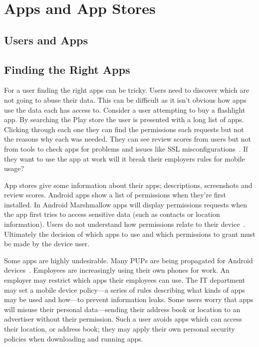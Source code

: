 \documentclass[thesis.tex]{subfiles}
\begin{document}
\chapter{Apps and App Stores}

\section{Users and Apps}

\section{Finding the Right Apps}

For a user finding the right apps can be tricky.
Users need to discover which are not going to abuse their data.
This can be difficult as it isn't obvious how apps use the data each has access to.
Consider a user attempting to buy a flashlight app.
By searching the Play store the user is presented with a long list of apps.
Clicking through each one they can find the permissions each requests but not the reasons why each was needed.
They can see review scores from users but not from tools to check apps for problems and issues like SSL misconfigurations~\cite{fahl_why_2012}.
If they want to use the app at work will it break their employers rules for mobile usage?

App stores give some information about their apps; descriptions, screenshots and review scores.
Android apps show a list of permissions when they're first installed.
In Android Marshmallow apps will display permissions requests when the app first tries to access sensitive data (such as contacts or location information).
Users do not understand how permissions relate to their device~\cite{felt_android_2012,thompson_when_2013}.
Ultimately the decision of which apps to use and which permissions to grant must be made by the device user.

Some apps are highly undesirable.
Many \acp{PUP} are being propagated for Android devices~\cite{truong_company_2014,vanja_svajcer_classifying_2013}.
Employees are increasingly using their own phones for work.
An employer may restrict which apps their employees can use.
The IT department may set a mobile device policy---a series of rules describing what kinds of apps may be used and how---to prevent information leaks.
Some users worry that apps will misuse their personal data---sending their address book or location to an advertiser without their permission.
Such a user avoids apps which can access their location, or address book; they may apply their own personal security policies when downloading and running apps.
\end{document}
